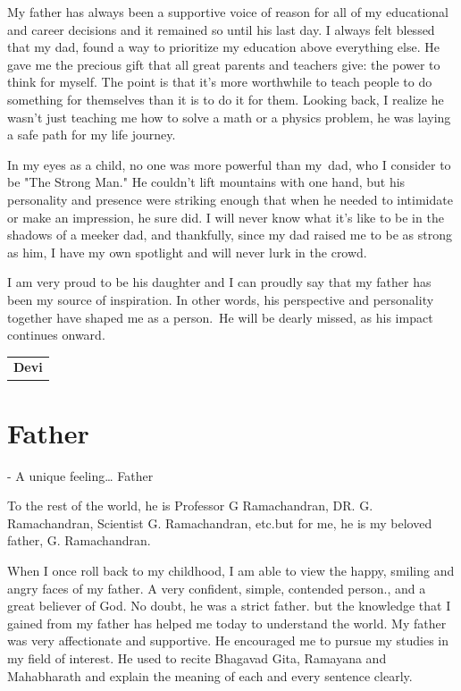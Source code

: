 My father has always been a supportive voice of reason for all of my educational and career decisions and it remained so until his last day. I always felt blessed that my dad, found a way to prioritize my education above everything else. He gave me the precious gift that all great parents and teachers give: the power to think for myself. The point is that it's more worthwhile to teach people to do something for themselves than it is to do it for them. Looking back, I realize he wasn't just teaching me how to solve a math or a physics problem, he was laying a safe path for my life journey.
\medskip

In my eyes as a child, no one was more powerful than my dad, who I consider to be "The Strong Man." He couldn't lift mountains with one hand, but his personality and presence were striking enough that when he needed to intimidate or make an impression, he sure did. I will never know what it's like to be in the shadows of a meeker dad, and thankfully, since my dad raised me to be as strong as him, I have my own spotlight and will never lurk in the crowd. 
\medskip

I am very proud to be his daughter and I can proudly say that my father has been my source of inspiration. In other words, his perspective and personality together have shaped me as a person. He will be dearly missed, as his impact continues onward.
\bigskip

\begin{flushright}
\begin{tabular}{c}
\multicolumn{1}{p{2cm}}{\textbf{Devi}}
\end{tabular}
\end{flushright}
\newpage

\section*{Father}

- A unique feeling… Father
\medskip

To the rest of the world, he is Professor G Ramachandran, DR. G. Ramachandran, Scientist  G. Ramachandran, etc.but for me, he is my beloved father, G. Ramachandran. 
\medskip

When I once roll back to my childhood, I am able to view the happy, smiling and angry faces of my father. A very confident, simple, contended person., and a great believer of God. No doubt, he was a strict father. but the knowledge that I gained from my father has helped me today to understand the world. My father was very affectionate and supportive. He encouraged me to pursue my studies in my field of interest. He used to recite Bhagavad Gita, Ramayana and Mahabharath and explain the meaning of each and every sentence clearly. 
\medskip


